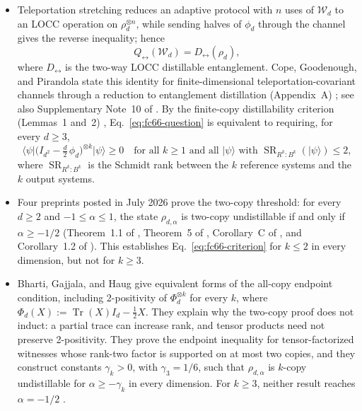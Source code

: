 \begin{itemize}
  \item Teleportation stretching reduces an adaptive protocol with $n$ uses of
  $\mathcal W_d$ to an LOCC operation on $\rho_d^{\otimes n}$, while sending
  halves of $\phi_d$ through the channel gives the reverse inequality; hence
  \begin{equation}
    Q_{\leftrightarrow}(\mathcal W_d)=D_{\leftrightarrow}(\rho_d),
    \label{eq:fc66-capacity-distillation}
  \end{equation}
  where $D_{\leftrightarrow}$ is the two-way LOCC distillable entanglement.
  Cope, Goodenough, and Pirandola state this identity for finite-dimensional
  teleportation-covariant channels through a reduction to entanglement
  distillation (Appendix~A)
  ; see also
  Supplementary Note~10 of .  By the
  finite-copy distillability criterion (Lemmas~1 and~2)
  ,
  Eq.~\eqref{eq:fc66-question} is equivalent to requiring, for every
  $d\geq3$,
  \begin{equation}
    \langle\psi\rvert\bigl(I_{d^2}-\tfrac d2\,\phi_d\bigr)^{\otimes k}
    \lvert\psi\rangle\geq0
    \quad\text{for all }k\geq1\text{ and all }\lvert\psi\rangle\text{ with }
    \operatorname{SR}_{R^k:B^k}(\lvert\psi\rangle)\leq2,
    \label{eq:fc66-criterion}
  \end{equation}
  where $\operatorname{SR}_{R^k:B^k}$ is the Schmidt rank between the $k$
  reference systems and the $k$ output systems.

  \item Four preprints posted in July 2026 prove the two-copy threshold: for
  every $d\geq2$ and $-1\leq\alpha\leq1$, the state $\rho_{d,\alpha}$ is
  two-copy undistillable if and only if $\alpha\geq-1/2$ (Theorem~1.1 of
  , Theorem~5 of
  , Corollary~C of
  , and Corollary~1.2 of
  ).  This establishes
  Eq.~\eqref{eq:fc66-criterion} for $k\leq2$ in every dimension, but not for
  $k\geq3$.

  \item Bharti, Gajjala, and Haug give equivalent forms of the all-copy endpoint
  condition, including 2-positivity of $\Phi_d^{\otimes k}$ for every $k$,
  where $\Phi_d(X):=\operatorname{Tr}(X)I_d-\frac12X$.  They explain why the
  two-copy proof does not induct: a partial trace can increase rank, and
  tensor products need not preserve 2-positivity.  They prove the endpoint
  inequality for tensor-factorized witnesses whose rank-two factor is
  supported on at most two copies, and they construct constants $\gamma_k>0$,
  with $\gamma_3=1/6$, such that $\rho_{d,\alpha}$ is $k$-copy undistillable
  for $\alpha\geq-\gamma_k$ in every dimension.  For $k\geq3$, neither result
  reaches $\alpha=-1/2$ .


\end{itemize}
